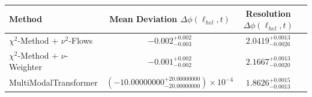     \begin{tabular}{lccc}
        \toprule
        Method & Mean Deviation $\Delta\phi(\ell_{hel}, t)$ & Resolution $\Delta\phi(\ell_{hel}, t)$ \\
        \midrule
        $\chi^2$-Method + $\nu^2$-Flows & $-0.002^{+0.002}_{-0.003}$ & $2.0419^{+0.0013}_{-0.0026}$ \\
        $\chi^2$-Method + $\nu$-Weighter & $-0.001^{+0.002}_{-0.002}$ & $2.1667^{+0.0013}_{-0.0020}$ \\
        MultiModalTransformer & $(-10.00000000^{+20.00000000}_{-20.00000000})\times 10^{-4}$ & $1.8626^{+0.0015}_{-0.0013}$ \\
        \bottomrule
    \end{tabular}